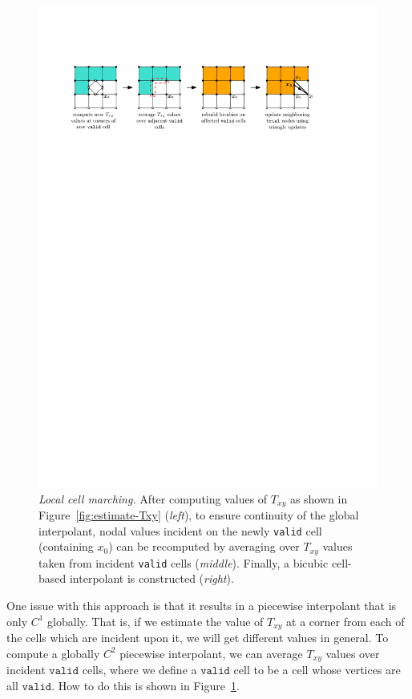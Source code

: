\documentclass{siamart190516}
\newcommand{\valid}{\texttt{valid}}
\begin{document}
\begin{figure}
  \centering
  \includegraphics[width=\linewidth]{rebuild-cells.pdf}
  \caption{\emph{Local cell marching.} After computing values of
    $T_{xy}$ as shown in Figure~\ref{fig:estimate-Txy} (\emph{left}),
    to ensure continuity of the global interpolant, nodal values
    incident on the newly \texttt{valid} cell (containing $x_0$) can
    be recomputed by averaging over $T_{xy}$ values taken from
    incident \texttt{valid} cells (\emph{middle}). Finally, a bicubic
    cell-based interpolant is constructed
    (\emph{right}).}\label{fig:rebuild-cells}
\end{figure}

One issue with this approach is that it results in a piecewise
interpolant that is only $C^1$ globally. That is, if we estimate the
value of $T_{xy}$ at a corner from each of the cells which are
incident upon it, we will get different values in general. To compute
a globally $C^2$ piecewise interpolant, we can average $T_{xy}$ values
over incident $\valid$ cells, where we define a $\valid$ cell to be a
cell whose vertices are all $\valid$. How to do this is shown in
Figure\ \ref{fig:rebuild-cells}.
\end{document}
